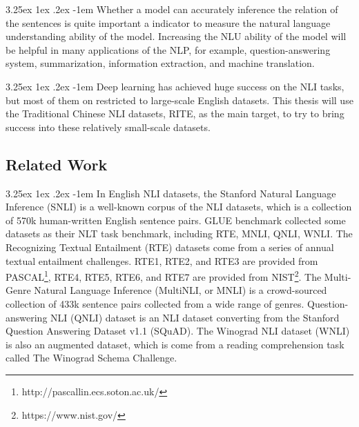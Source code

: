 \documentclass[12pt]{article}
\makeatletter
\renewcommand\paragraph{\@startsection{paragraph}{5}{\z@}%
  {3.25ex \@plus1ex \@minus.2ex}%
  {-1em}%
  {\normalfont\normalsize\bfseries}}
\makeatother
\begin{document}
\begin{CJK*}{UTF8}{bkai}
\begin{spacing}{1.77}
\paragraph{}
Whether a model can accurately inference the relation of the sentences is quite important a indicator to measure the natural language understanding ability of the model. Increasing the NLU ability of the model will be helpful in many applications of the NLP, for example, question-answering system, summarization, information extraction, and machine translation.

\paragraph{}
Deep learning has achieved huge success on the NLI tasks, but most of them on restricted to large-scale English datasets. This thesis will use the Traditional Chinese NLI datasets, RITE, as the main target, to try to bring success into these relatively small-scale datasets.

\subsection{Related Work} \label{sec:related_work}
\paragraph{}
In English NLI datasets, the Stanford Natural Language Inference (SNLI)\cite{snli:emnlp2015} is a well-known corpus of the NLI datasets, which is a collection of 570k human-written English sentence pairs. GLUE benchmark collected some datasets as their NLT task benchmark, including RTE, MNLI, QNLI, WNLI. The Recognizing Textual Entailment (RTE) datasets come from a series of annual textual entailment challenges. RTE1\cite{dagan2006pascal}, RTE2\cite{bar2006second}, and RTE3\cite{giampiccolo2007third} are provided from PASCAL\footnote{http://pascallin.ecs.soton.ac.uk/}, RTE4, RTE5\cite{bentivogli2009fifth}, RTE6, and RTE7 are provided from NIST\footnote{https://www.nist.gov/}. The Multi-Genre Natural Language Inference (MultiNLI, or MNLI)\cite{N18-1101} is a crowd-sourced collection of 433k sentence pairs collected from a wide range of genres. Question-answering NLI (QNLI)\cite{wang2019glue} dataset is an NLI dataset converting from the Stanford Question Answering Dataset v1.1 (SQuAD)\cite{rajpurkar2016squad}. The Winograd NLI dataset (WNLI) is also an augmented dataset, which is come from a reading comprehension task called The Winograd Schema Challenge\cite{levesque2011winograd}.


\end{spacing}
\end{CJK*}
\end{document}
